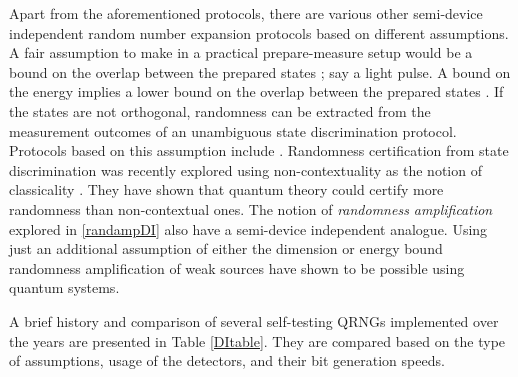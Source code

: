 \documentclass[]{interact}
\theoremstyle{plain}%
\theoremstyle{definition}
\theoremstyle{remark}
\begin{document}
Apart from the aforementioned protocols, there are various other semi-device independent random number expansion protocols based on different assumptions. A fair assumption to make in a practical prepare-measure setup would be a bound on the overlap between the prepared states \cite{VanHimbeeck2016Dec}; say a light pulse. A bound on the energy implies a lower bound on the overlap between the prepared states \cite{VanHimbeeck2019May}. If the states are not orthogonal, randomness can be extracted from the measurement outcomes of an unambiguous state discrimination protocol. Protocols based on this assumption include \cite{Tebyanian2021Sep,Tebyanian2021Dec,Rusca2020Jun,PhysRevA.100.062338}. Randomness certification from state discrimination was recently explored using non-contextuality as the notion of classicality \cite{Carceller2021Dec}. They have shown that quantum theory could certify more randomness than non-contextual ones. The notion of \emph{randomness amplification} explored in \autoref{randampDI} also have a semi-device independent analogue. Using just an additional assumption of either the dimension \cite{Zhou2015Aug} or energy bound \cite{Senno2021Aug} randomness amplification of weak sources have shown to be possible using quantum systems.

A brief history and comparison of several self-testing QRNGs implemented over the years are presented in Table \ref{DItable}. They are compared based on the type of assumptions, usage of the detectors, and their bit generation speeds.
\end{document}
